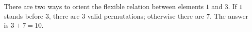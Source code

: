 There are two ways to orient the flexible relation between elements $1$ and $3$. If $1$ stands before $3$, there are $3$ valid permutations; otherwise there are $7$. The answer is $3 + 7 = 10$.
